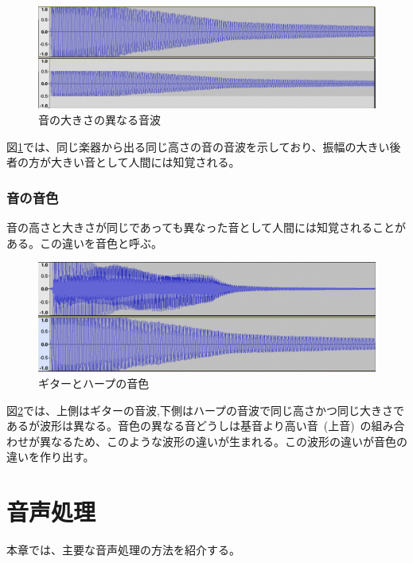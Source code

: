 \begin{figure}[t]
\begin{center}
\includegraphics[width=0.7\hsize]{figure/c4_harp_loudness.png}
\caption{音の大きさの異なる音波}
\label{fig:loudness}
\end{center}
\end{figure}

図\ref{fig:loudness}では、同じ楽器から出る同じ高さの音の音波を示しており、振幅の大きい後者の方が大きい音として人間には知覚される。

\subsection{音の音色}

音の高さと大きさが同じであっても異なった音として人間には知覚されることがある。この違いを音色と呼ぶ。

\begin{figure}[t]
\begin{center}
\includegraphics[width=0.7\hsize]{figure/c4_guitar_harp.png}
\caption{ギターとハープの音色}
\label{fig:guitar_harp_comp}
\end{center}
\end{figure}

図\ref{fig:guitar_harp_comp}では、上側はギターの音波,下側はハープの音波で同じ高さかつ同じ大きさであるが波形は異なる。音色の異なる音どうしは基音より高い音~(上音)~の組み合わせが異なるため、このような波形の違いが生まれる。この波形の違いが音色の違いを作り出す。

\chapter{音声処理}

本章では、主要な音声処理の方法を紹介する。
